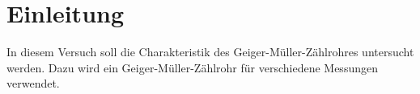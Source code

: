 
\section{Einleitung}
In diesem Versuch soll die Charakteristik des 
Geiger-Müller-Zählrohres untersucht werden. Dazu
wird ein Geiger-Müller-Zählrohr für verschiedene Messungen
verwendet.